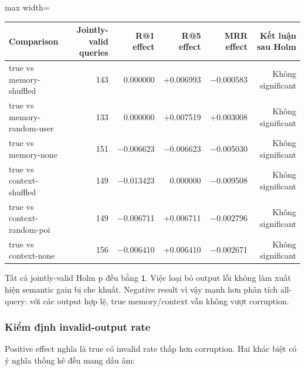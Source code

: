 \begin{table}[!htbp]
\centering
\scriptsize
\setlength{\tabcolsep}{2.5pt}
\begin{adjustbox}{max width=\textwidth}
\begin{tabular}{@{}lrrrrr@{}}
\toprule
Comparison & Jointly-valid queries & R@1 effect & R@5 effect & MRR effect & Kết luận sau Holm \\
\midrule
true vs memory-shuffled & 143 & 0.000000 & +0.006993 & −0.000583 & Không significant \\
true vs memory-random-user & 133 & 0.000000 & +0.007519 & +0.003008 & Không significant \\
true vs memory-none & 151 & −0.006623 & −0.006623 & −0.005030 & Không significant \\
true vs context-shuffled & 149 & −0.013423 & 0.000000 & −0.009508 & Không significant \\
true vs context-random-poi & 149 & −0.006711 & +0.006711 & −0.002796 & Không significant \\
true vs context-none & 156 & −0.006410 & +0.006410 & −0.002671 & Không significant \\
\bottomrule
\end{tabular}
\end{adjustbox}
\end{table}

Tất cả jointly-valid Holm p đều bằng \texttt{1}. Việc loại bỏ output lỗi không làm xuất hiện semantic gain bị che khuất. Negative result vì vậy mạnh hơn phân tích all-query: với các output hợp lệ, true memory/context vẫn không vượt corruption.

\subsubsection*{Kiểm định invalid-output rate}

Positive effect nghĩa là true có invalid rate thấp hơn corruption. Hai khác biệt có ý nghĩa thống kê đều mang dấu âm:

